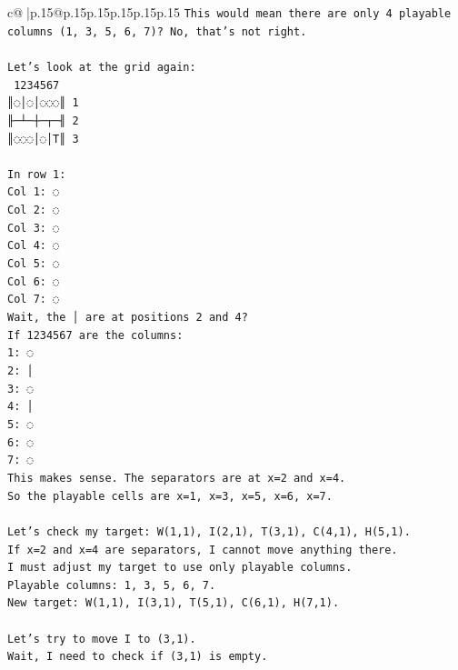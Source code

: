 \documentclass{article}
\begin{document}
{\begin{supertabular}{c@{$\;$}|p{.15\linewidth}@{}p{.15\linewidth}p{.15\linewidth}p{.15\linewidth}p{.15\linewidth}p{.15\linewidth}}
{{{\texttt{This would mean there are only 4 playable columns (1, 3, 5, 6, 7)? No, that's not right.} \\
\\ 
\texttt{Let's look at the grid again:} \\
\texttt{ 1234567} \\
\texttt{║◌│◌│◌◌◌║ 1} \\
\texttt{╟─┴─┼─┬─╢ 2} \\
\texttt{║◌◌◌│◌│T║ 3} \\
\\ 
\texttt{In row 1:} \\
\texttt{Col 1: ◌} \\
\texttt{Col 2: ◌} \\
\texttt{Col 3: ◌} \\
\texttt{Col 4: ◌} \\
\texttt{Col 5: ◌} \\
\texttt{Col 6: ◌} \\
\texttt{Col 7: ◌} \\
\texttt{Wait, the │ are at positions 2 and 4?} \\
\texttt{If 1234567 are the columns:} \\
\texttt{1: ◌} \\
\texttt{2: │} \\
\texttt{3: ◌} \\
\texttt{4: │} \\
\texttt{5: ◌} \\
\texttt{6: ◌} \\
\texttt{7: ◌} \\
\texttt{This makes sense. The separators are at x=2 and x=4.} \\
\texttt{So the playable cells are x=1, x=3, x=5, x=6, x=7.} \\
\\ 
\texttt{Let's check my target: W(1,1), I(2,1), T(3,1), C(4,1), H(5,1).} \\
\texttt{If x=2 and x=4 are separators, I cannot move anything there.} \\
\texttt{I must adjust my target to use only playable columns.} \\
\texttt{Playable columns: 1, 3, 5, 6, 7.} \\
\texttt{New target: W(1,1), I(3,1), T(5,1), C(6,1), H(7,1).} \\
\\ 
\texttt{Let's try to move I to (3,1).} \\
\texttt{Wait, I need to check if (3,1) is empty.} \\
}}}
\end{supertabular}}
\end{document}
